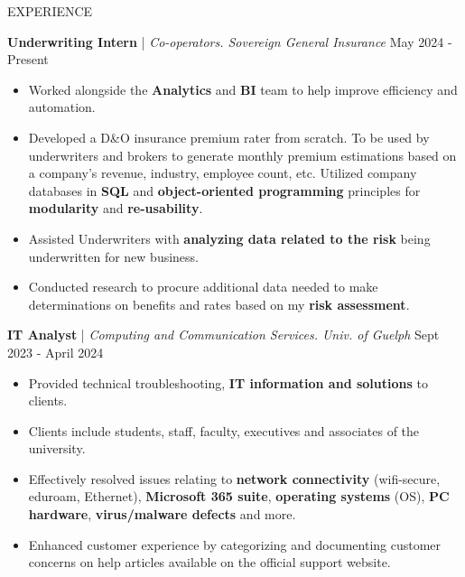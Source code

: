 \begin{rSection}{EXPERIENCE}

\newcommand{\SubItem}[1]{
    {\setlength\itemindent{15pt} \item[\tiny$\bullet] #1}
}

\quad\textbf{Underwriting Intern} | \textit{Co-operators. Sovereign General Insurance} \hfill May 2024 - Present\\
\renewcommand\labelitemi{$\vcenter{\hbox{\tiny$\bullet$}}$}
\begin{itemize}
    \itemsep -4pt {} \vspace{-1.5em} 
        \item Worked alongside the \textbf{Analytics} and \textbf{BI} team to help improve efficiency and automation.
        \item Developed a D\&O insurance premium rater from scratch. To be used by underwriters and brokers to generate monthly premium estimations based on a company's revenue, industry, employee count, etc. Utilized company databases in \textbf{SQL} and \textbf{object-oriented programming} principles for \textbf{modularity} and \textbf{re-usability}.
        \item Assisted Underwriters with \textbf{analyzing data related to the risk} being underwritten for new business.
        \item Conducted research to procure additional data needed to make determinations on benefits and rates based on my \textbf{risk assessment}.
\end{itemize}

\quad\textbf{IT Analyst} | \textit{Computing and Communication Services. Univ. of Guelph} \hfill Sept 2023 - April 2024\\
\renewcommand\labelitemi{$\vcenter{\hbox{\tiny$\bullet$}}$}
\begin{itemize}
    \itemsep -4pt {} \vspace{-1.5em}
        \item Provided technical troubleshooting, \textbf{IT information and solutions} to clients.
        \item Clients include students, staff, faculty, executives and associates of the university.
        \item Effectively resolved issues relating to \textbf{network connectivity} (wifi-secure, eduroam, Ethernet), \textbf{Microsoft 365 suite}, \textbf{operating systems} (OS), \textbf{PC hardware}, \textbf{virus/malware defects} and more.
        \item Enhanced customer experience by categorizing and documenting customer concerns on help articles available on the official support website.
\end{itemize}


\end{rSection}
